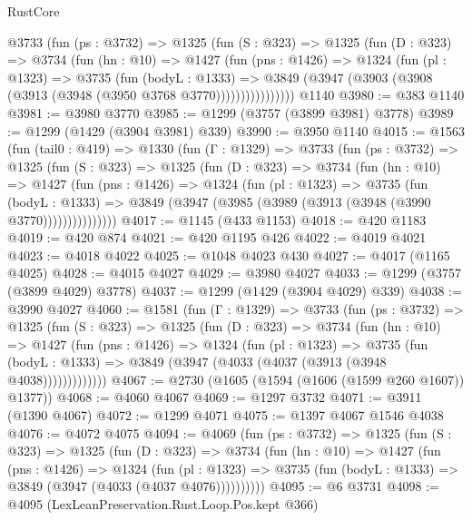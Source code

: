 \begin{lexlean}{RustCore}
\begin{coremodule}
        @3733
          (fun (ps : @3732) =>
          @1325
            (fun (S : @323) =>
            @1325
              (fun (D : @323) =>
              @3734
                (fun (hn : @10) =>
                @1427
                  (fun (pns : @1426) =>
                  @1324
                    (fun (pl : @1323) =>
                    @3735
                      (fun (bodyL : @1333) =>
                      @3849 (@3947 (@3903 (@3908 (@3913 (@3948 (@3950 @3768 @3770))))))))))))))))
    @1140
@3980 := @383 @1140
@3981 := @3980 @3770
@3985 := @1299 (@3757 (@3899 @3981) @3778)
@3989 := @1299 (@1429 (@3904 @3981) @339)
@3990 := @3950 @1140
@4015 := @1563
    (fun (tail0 : @419) =>
    @1330
      (fun (Γ : @1329) =>
      @3733
        (fun (ps : @3732) =>
        @1325
          (fun (S : @323) =>
          @1325
            (fun (D : @323) =>
            @3734
              (fun (hn : @10) =>
              @1427
                (fun (pns : @1426) =>
                @1324
                  (fun (pl : @1323) =>
                  @3735
                    (fun (bodyL : @1333) =>
                    @3849 (@3947 (@3985 (@3989 (@3913 (@3948 (@3990 @3770)))))))))))))))
@4017 := @1145 (@433 @1153)
@4018 := @420 @1183
@4019 := @420 @874
@4021 := @420 @1195 @426
@4022 := @4019 @4021
@4023 := @4018 @4022
@4025 := @1048 @4023 @430
@4027 := @4017 (@1165 @4025)
@4028 := @4015 @4027
@4029 := @3980 @4027
@4033 := @1299 (@3757 (@3899 @4029) @3778)
@4037 := @1299 (@1429 (@3904 @4029) @339)
@4038 := @3990 @4027
@4060 := @1581
    (fun (Γ : @1329) =>
    @3733
      (fun (ps : @3732) =>
      @1325
        (fun (S : @323) =>
        @1325
          (fun (D : @323) =>
          @3734
            (fun (hn : @10) =>
            @1427
              (fun (pns : @1426) =>
              @1324
                (fun (pl : @1323) =>
                @3735
                  (fun (bodyL : @1333) =>
                  @3849 (@3947 (@4033 (@4037 (@3913 (@3948 @4038)))))))))))))
@4067 := @2730 (@1605 (@1594 (@1606 (@1599 @260 @1607)) @1377))
@4068 := @4060 @4067
@4069 := @1297 @3732
@4071 := @3911 (@1390 @4067)
@4072 := @1299 @4071
@4075 := @1397 @4067 @1546 @4038
@4076 := @4072 @4075
@4094 := @4069
    (fun (ps : @3732) =>
    @1325
      (fun (S : @323) =>
      @1325
        (fun (D : @323) =>
        @3734
          (fun (hn : @10) =>
          @1427
            (fun (pns : @1426) =>
            @1324
              (fun (pl : @1323) =>
              @3735 (fun (bodyL : @1333) => @3849 (@3947 (@4033 (@4037 @4076))))))))))
@4095 := @6 @3731
@4098 := @4095 (LexLeanPreservation.Rust.Loop.Pos.kept @366)

\end{coremodule}
\end{lexlean}
